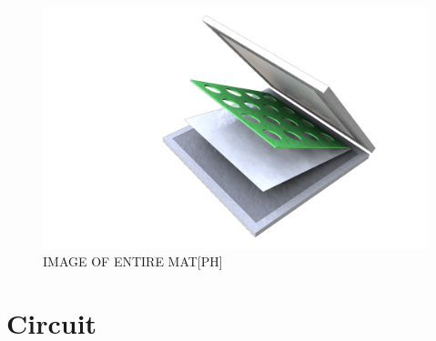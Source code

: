 	\begin{figure}[H]
		\centering
		\includegraphics[width=0.7\linewidth]{figure/Implementation/Medialogyp4mat}
		\caption{IMAGE OF ENTIRE MAT[PH]}
		\label{fig:finalMat}
	\end{figure}
	
\section{Circuit}